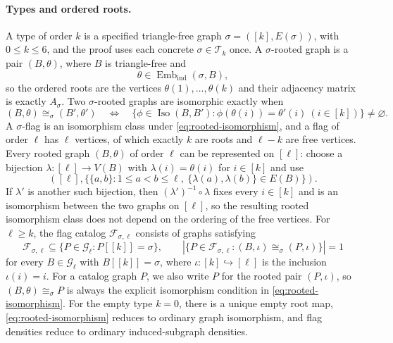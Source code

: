 \documentclass[11pt]{article}
\begin{document}
\paragraph{Types and ordered roots.}
A type of order $k$ is a specified triangle-free graph $\sigma=([k],E(\sigma))$, with $0\leq k\leq6$, and the proof uses each concrete $\sigma\in\mathcal T_k$ once.
A $\sigma$-rooted graph is a pair $(B,\theta)$, where $B$ is triangle-free and
\begin{equation}\label{eq:root-embedding}
\theta\in\operatorname{Emb}_{\mathrm{ind}}(\sigma,B),
\end{equation}
so the ordered roots are the vertices $\theta(1),\ldots,\theta(k)$ and their adjacency matrix is exactly $A_\sigma$.
Two $\sigma$-rooted graphs are isomorphic exactly when
\begin{equation}\label{eq:rooted-isomorphism}
(B,\theta)\cong_\sigma(B',\theta')
\quad\Longleftrightarrow\quad
\{\phi\in\operatorname{Iso}(B,B'):
\phi(\theta(i))=\theta'(i)\ (i\in[k])\}\ne\varnothing.
\end{equation}
A $\sigma$-flag is an isomorphism class under \eqref{eq:rooted-isomorphism}, and a flag of order $\ell$ has $\ell$ vertices, of which exactly $k$ are roots and $\ell-k$ are free vertices.
Every rooted graph $(B,\theta)$ of order $\ell$ can be represented on $[\ell]$: choose a bijection $\lambda:[\ell]\to V(B)$ with $\lambda(i)=\theta(i)$ for $i\in[k]$ and use
\[
\left([\ell],\{\{a,b\}:1\leq a<b\leq\ell,\ 
\{\lambda(a),\lambda(b)\}\in E(B)\}\right).
\]
If $\lambda'$ is another such bijection, then $(\lambda')^{-1}\circ\lambda$ fixes every $i\in[k]$ and is an isomorphism between the two graphs on $[\ell]$, so the resulting rooted isomorphism class does not depend on the ordering of the free vertices.
For $\ell\geq k$, the flag catalog $\mathcal F_{\sigma,\ell}$ consists of graphs satisfying
\begin{equation}\label{eq:flag-catalog}
\mathcal F_{\sigma,\ell}\subseteq
\{P\in\mathcal G_\ell:P[[k]]=\sigma\},
\qquad
\left|\{P\in\mathcal F_{\sigma,\ell}:(B,\iota)\cong_\sigma(P,\iota)\}\right|=1
\end{equation}
for every $B\in\mathcal G_\ell$ with $B[[k]]=\sigma$, where $\iota:[k]\hookrightarrow[\ell]$ is the inclusion $\iota(i)=i$.
For a catalog graph $P$, we also write $P$ for the rooted pair $(P,\iota)$, so $(B,\theta)\cong_\sigma P$ is always the explicit isomorphism condition in \eqref{eq:rooted-isomorphism}.
For the empty type $k=0$, there is a unique empty root map, \eqref{eq:rooted-isomorphism} reduces to ordinary graph isomorphism, and flag densities reduce to ordinary induced-subgraph densities.
\end{document}
